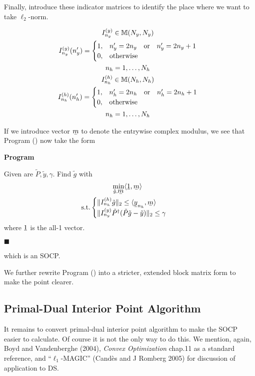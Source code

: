 \documentclass[12pt]{article}
\newcommand{\MB}[1]{\mathbb{#1}}
\newcommand{\RM}[1]{\mathrm{#1}}
\newcommand{\T}[1]{\tilde{#1}}
\newcommand{\V}[1]{\stackunder[1.2pt]{$#1$}{\rule{.9ex}{.075ex}}}
\newcommand{\LA}{\langle}
\newcommand{\RA}{\rangle}
\newcounter{NumResult}
\newcommand{\myCount}
{
   \stepcounter{NumResult}
   \textbf{\arabic{NumResult}}
}
\newcommand {\Result} [2]
{
   \bigskip
   \myCount \textbf{#1} \par
   {#2} \par
   \hfill \(\blacksquare\)
   \bigskip
}
\begin{document}
Finally, introduce these indicator matrices to identify the place where we want to take \(\ell_2\)-norm.

\begin{gather}
I_{n_y}^{(y)} \in \MB{M}(N_y, N_y) \\
I_{n_y}^{(y)}(n_y')
=\begin{cases}
1, &n_y' =2n_y \quad \RM{or} \quad n_y' =2n_y+1 \notag \\
0, &\RM{otherwise}
\end{cases} \\
n_h =1, \dotsc, N_h \notag \\
I_{n_h}^{(h)} \in \MB{M}(N_h, N_h) \\
I_{n_h}^{(h)}(n_h')
=\begin{cases}
1, &n_h' =2n_h \quad \RM{or} \quad n_h' =2n_h+1 \notag \\
0, &\RM{otherwise}
\end{cases} \\
n_h =1, \dotsc, N_h \notag
\end{gather}

If we introduce vector \(\V{m}\) to denote the entrywise complex modulus, we see that Program () now take the form

\Result
{Program}
{
Given are \(\T{P}, \T{y}, \gamma\).
Find \(\T{g}\) with
\begin{gather}
   \min_{\T{g}, \V{m}} \LA \V{1}, \V{m} \RA \notag \\
\RM{s.t.}
\begin{cases}
\| I_{n_h}^{(h)} \T{g} \|_2
   \leq \LA \V{y}_{n_h}, \V{m} \RA \\
\| I_{n_y}^{(y)} \T{P}^\dagger ( \T{P} \T{g} - \T{y} ) \|_2
\leq \gamma  \\
\end{cases}
\end{gather}
where \(\V{1}\) is the all-1 vector.
}

which is an SOCP.

We further rewrite Program () into a stricter, extended block matrix form to make the point clearer.

\subsection{Primal-Dual Interior Point Algorithm}

It remains to convert primal-dual interior point algorithm to make the SOCP easier to calculate.
Of course it is not the only way to do this.
We mention, again, Boyd and Vandenberghe (2004), \textit{Convex Optimization} chap.11 as a standard reference, and ``\(\ell_1\)-MAGIC'' (Cand\`es and J Romberg 2005) for discussion of application to DS.
\end{document}
